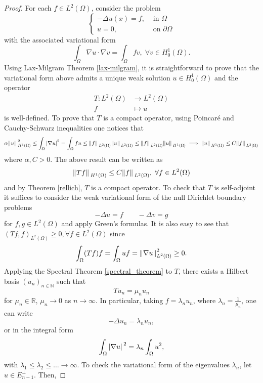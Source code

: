 \begin{proof}
    For each \(f \in L^2(\Omega)\), consider the problem
    \[
        \begin{cases}
            -\Delta u(x) = f, & \text{ in } \Omega\\
            u = 0, & \text{ on } \partial \Omega
        \end{cases} 
    \]
    with the associated variational form
    \[
        \int_\Omega \nabla u \cdot \nabla v = \int_\Omega f v, \; \forall v \in H^1_0(\Omega).
    \]
    Using Lax-Milgram Theorem \ref{lax-milgram}, it is straightforward to prove that the variational form above admits a unique weak solution \(u \in H^1_0(\Omega)\) and the operator
    \begin{align*}
        T: L^2(\Omega) &\rightarrow L^2(\Omega)\\
        f &\mapsto u
    \end{align*}
    is well-defined. To prove that \(T\) is a compact operator, using Poincaré and Cauchy-Schwarz inequalities one notices that
    \[
        \alpha\norm*{u}_{H^1(\Omega)}^2 \leq \int_\Omega \abs{\nabla u}^2 = \int_\Omega f u \leq \norm*{f}_{L^2(\Omega)}\norm*{u}_{L^2(\Omega)} \leq \norm*{f}_{L^2(\Omega)}\norm*{u}_{H^1(\Omega)} \implies \norm*{u}_{H^1(\Omega)} \leq C \norm*{f}_{L^2(\Omega)}
    \]
    where \(\alpha, C > 0\). The above result can be written as
    \[
        \norm*{Tf}_{H^1(\Omega)} \leq C \norm*{f}_{L^2(\Omega)}, \; \forall f \in L^2(\Omega)
    \]
    and by Theorem \ref{rellich}, \(T\) is a compact operator. To check that \(T\) is self-adjoint it suffices to consider the weak variational form of the null Dirichlet boundary problems
    \[
        -\Delta u = f \qquad -\Delta v = g
    \]
    for \(f,g \in L^2(\Omega)\) and apply Green's formulas. It is also easy to see that \((Tf, f)_{L^2(\Omega)} \geq 0, \forall f \in L^2(\Omega)\) since 
    \[
        \int_\Omega (Tf) f = \int_\Omega u f = \norm{\nabla u}_{L^2(\Omega)}^2 \geq 0.
    \]
    Applying the Spectral Theorem \ref{spectral_theorem} to \(T\), there exists a Hilbert basis \((u_n)_{n \in \mathbb{N}}\) such that
    \[
        T u_n = \mu_n u_n
    \]
    for \(\mu_n \in \mathbb{R}\), \(\mu_n \rightarrow 0\) as \(n \rightarrow \infty\). In particular, taking \(f = \lambda_n u_n\), where \(\lambda_n = \frac{1}{\mu_n}\), one can write
    \[
        -\Delta u_n = \lambda_n u_n,
    \]
    or in the integral form
    \[
        \int_\Omega \abs*{\nabla u}^2 = \lambda_n \int_\Omega u^2,
    \]
    with \(\lambda_1 \leq \lambda_2 \leq \dots \rightarrow \infty\). To check the variational form of the eigenvalues \(\lambda_n\), let \(u \in E_{n-1}^\perp\). Then,

\end{proof}
